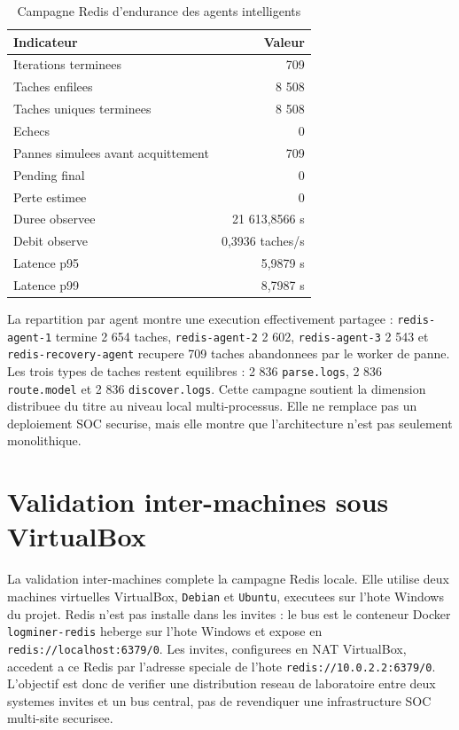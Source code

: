 \begin{table}[H]
\centering
\caption{Campagne Redis d'endurance des agents intelligents}
\label{tab:intelligent-redis-long}
\scriptsize
\begin{tabular}{lr}
\toprule
\textbf{Indicateur} & \textbf{Valeur} \\
\midrule
Iterations terminees & 709 \\
Taches enfilees & 8 508 \\
Taches uniques terminees & 8 508 \\
Echecs & 0 \\
Pannes simulees avant acquittement & 709 \\
Pending final & 0 \\
Perte estimee & 0 \\
Duree observee & 21 613,8566 s \\
Debit observe & 0,3936 taches/s \\
Latence p95 & 5,9879 s \\
Latence p99 & 8,7987 s \\
\bottomrule
\end{tabular}
\end{table}

La repartition par agent montre une execution effectivement partagee : \texttt{redis-agent-1} termine 2 654 taches, \texttt{redis-agent-2} 2 602, \texttt{redis-agent-3} 2 543 et \texttt{redis-recovery-agent} recupere 709 taches abandonnees par le worker de panne. Les trois types de taches restent equilibres : 2 836 \texttt{parse.logs}, 2 836 \texttt{route.model} et 2 836 \texttt{discover.logs}. Cette campagne soutient la dimension distribuee du titre au niveau local multi-processus. Elle ne remplace pas un deploiement SOC securise, mais elle montre que l'architecture n'est pas seulement monolithique.

\section{Validation inter-machines sous VirtualBox}
La validation inter-machines complete la campagne Redis locale. Elle utilise deux machines virtuelles VirtualBox, \texttt{Debian} et \texttt{Ubuntu}, executees sur l'hote Windows du projet. Redis n'est pas installe dans les invites : le bus est le conteneur Docker \texttt{logminer-redis} heberge sur l'hote Windows et expose en \texttt{redis://localhost:6379/0}. Les invites, configurees en NAT VirtualBox, accedent a ce Redis par l'adresse speciale de l'hote \texttt{redis://10.0.2.2:6379/0}. L'objectif est donc de verifier une distribution reseau de laboratoire entre deux systemes invites et un bus central, pas de revendiquer une infrastructure SOC multi-site securisee.

